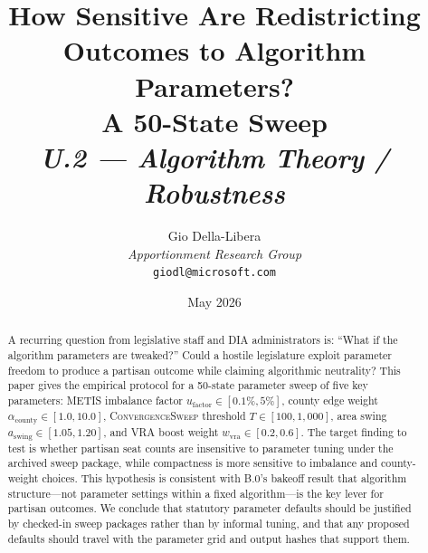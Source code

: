 \documentclass[12pt]{article}
\title{%
  \textbf{How Sensitive Are Redistricting Outcomes to Algorithm Parameters?}\\
  \textbf{A 50-State Sweep}\\[0.8em]
  \normalsize\textit{U.2 --- Algorithm Theory / Robustness}%
}
\author{%
  Gio Della-Libera\\
  \textit{Apportionment Research Group}\\
  \small\texttt{giodl@microsoft.com}
}
\date{May 2026}
\newcommand{\cs}{\textsc{ConvergenceSweep}}
\newcommand{\ufactor}{\ensuremath{u_{\mathrm{factor}}}}
\newcommand{\acounty}{\ensuremath{\alpha_{\mathrm{county}}}}
\newcommand{\aswing}{\ensuremath{a_{\mathrm{swing}}}}
\newcommand{\wvra}{\ensuremath{w_{\mathrm{vra}}}}
\begin{document}
\maketitle

\begin{abstract}
\noindent
A recurring question from legislative staff and DIA administrators is:
``What if the algorithm parameters are tweaked?''
Could a hostile legislature exploit parameter freedom to produce
a partisan outcome while claiming algorithmic neutrality?
This paper gives the empirical protocol for a 50-state parameter sweep of five
key parameters: METIS imbalance factor
$\ufactor \in [0.1\%, 5\%]$, county edge weight $\acounty \in [1.0, 10.0]$,
\cs{} threshold $T \in [100, 1{,}000]$, area swing $\aswing \in [1.05, 1.20]$,
and VRA boost weight $\wvra \in [0.2, 0.6]$.
The target finding to test is whether partisan seat counts are insensitive to
parameter tuning under the archived sweep package, while compactness is more
sensitive to imbalance and county-weight choices.
This hypothesis is consistent with B.0's bakeoff result that
algorithm structure---not parameter settings within a fixed algorithm---is
the key lever for partisan outcomes.
We conclude that statutory parameter defaults should be justified by checked-in
sweep packages rather than by informal tuning, and that any proposed defaults
should travel with the parameter grid and output hashes that support them.
\end{abstract}

\tableofcontents
\newpage












\end{document}

